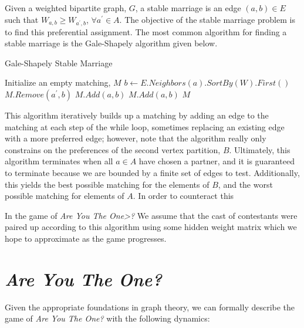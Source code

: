 \documentclass{article}
\begin{document}
Given a weighted bipartite graph, $G$, a stable marriage is an
edge $(a, b) \in E$ such that $W_{a, b} \geq W_{a^\prime, b}$,
$\forall a^\prime \in A$. The objective of the stable marriage
problem is to find this preferential assignment. The most common
algorithm for finding a stable marriage is the Gale-Shapely algorithm
given below.

\begin{algorithm}
  \caption{Gale-Shapely Stable Marriage}\label{alg:gale-shapely}
  \begin{algorithmic}[1]
    \State Initialize an empty matching, $M$
    \State $b \gets E.Neighbors(a).SortBy(W).First()$
    \State $M.Remove(a^\prime, b)$
    \State $M.Add(a, b)$
    \EndIf
    \Else
    \State $M.Add(a, b)$
    \EndIf
    \EndWhile
    \Return $M$
    \EndProcedure
  \end{algorithmic}
\end{algorithm}

This algorithm iteratively builds up a matching by adding an edge
to the matching at each step of the while loop, sometimes replacing
an existing edge with a more preferred edge; however, note that the
algorithm really only constrains on the preferences of the second vertex
partition, $B$. Ultimately, this algorithm terminates when all $a \in A$
have chosen a partner, and it is guaranteed to terminate because we are
bounded by a finite set of edges to test. Additionally, this yields the
best possible matching for the elements of $B$, and the worst possible
matching for elements of $A$. In order to counteract this

In the game of \textit{Are You The One>?} We assume that the cast of
contestants were paired up according to this algorithm using some hidden
weight matrix which we hope to approximate as the game progresses.


\section{\textit{Are You The One?}}

Given the appropriate foundations in graph theory, we can formally describe
the game of \textit{Are You The One?} with the following dynamics:
\end{document}
